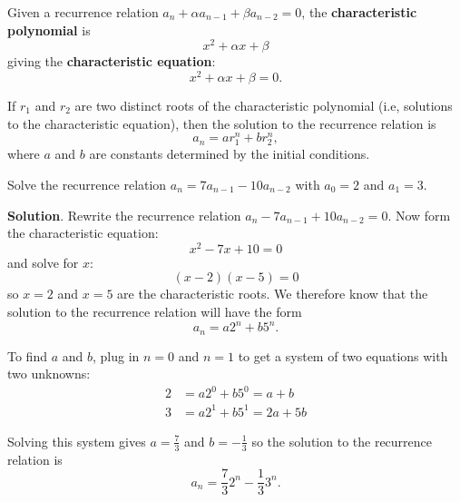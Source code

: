 \documentclass[11pt,]{book}
\newcommand{\terminology}[1]{\textbf{#1}}
\theoremstyle{ptxplainnotitle}
\theoremstyle{ptxplaintitle}
\theoremstyle{ptxdefinitionnotitle}
\theoremstyle{ptxdefinitiontitle}
\theoremstyle{ptxdefinitionnotitle}
\theoremstyle{ptxdefinitiontitle}
\theoremstyle{ptxdefinitionnotitle}
\theoremstyle{ptxdefinitiontitle}
\theoremstyle{ptxdefinitiontitlenonumber}
\theoremstyle{ptxdefinitiontitlenonumber}
\numberwithin{equation}{chapter}
\newcommand{\amp}{&}
\begin{document}
\begin{assemblage}\label{assemblage-6}
\hypertarget{p-456}{}%
 Given a recurrence relation \(a_n + \alpha a_{n-1} + \beta a_{n-2} = 0\), the \terminology{characteristic polynomial} is%
\begin{equation*}
x^2 + \alpha x + \beta
\end{equation*}
giving the \terminology{characteristic equation}:%
\begin{equation*}
x^2 + \alpha x + \beta = 0.
\end{equation*}
%
\par
\hypertarget{p-457}{}%
If \(r_1\) and \(r_2\) are two distinct roots of the characteristic polynomial (i.e, solutions to the characteristic equation), then the solution to the recurrence relation is%
\begin{equation*}
a_n = ar_1^n + br_2^n,
\end{equation*}
where \(a\) and \(b\) are constants determined by the initial conditions.%
\end{assemblage}
\begin{example}\label{example-23}
\hypertarget{p-458}{}%
Solve the recurrence relation \(a_n = 7a_{n-1} - 10 a_{n-2}\) with \(a_0 = 2\) and \(a_1 = 3\).%
\par\smallskip%
\noindent\textbf{Solution}.\hypertarget{solution-62}{}\quad%
\hypertarget{p-459}{}%
Rewrite the recurrence relation \(a_n - 7a_{n-1} + 10a_{n-2} = 0\). Now form the characteristic equation:%
\begin{equation*}
x^2 - 7x + 10 = 0
\end{equation*}
and solve for \(x\):%
\begin{equation*}
(x - 2) (x - 5) = 0
\end{equation*}
so \(x = 2\) and \(x = 5\) are the characteristic roots. We therefore know that the solution to the recurrence relation will have the form%
\begin{equation*}
a_n = a 2^n + b 5^n.
\end{equation*}
%
\par
\hypertarget{p-460}{}%
To find \(a\) and \(b\), plug in \(n =0\) and \(n = 1\) to get a system of two equations with two unknowns:%
\begin{align*}
2 \amp = a 2^0 + b 5^0 = a + b\\
3 \amp = a 2^1 + b 5^1 = 2a + 5b
\end{align*}
%
\par
\hypertarget{p-461}{}%
Solving this system gives \(a = \frac{7}{3}\) and \(b = -\frac{1}{3}\) so the solution to the recurrence relation is%
\begin{equation*}
a_n = \frac{7}{3}2^n - \frac{1}{3} 3^n.
\end{equation*}
%
\end{example}
\end{document}
